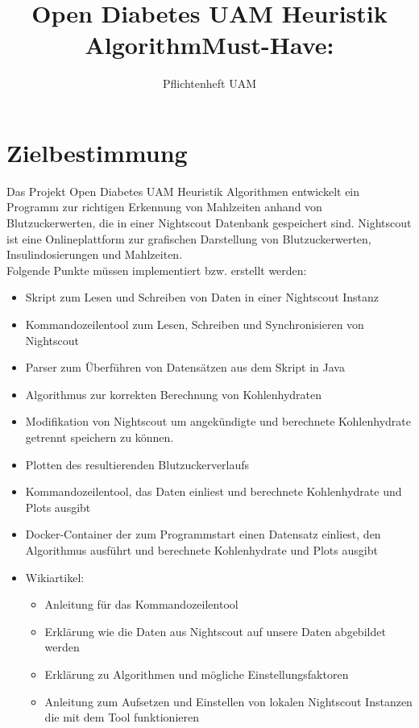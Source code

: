 \documentclass[accentcolor=tud0b,12pt,paper=a4]{tudreport}
\title{Open Diabetes UAM Heuristik Algorithm}
\subtitle{Pflichtenheft UAM}
\begin{document}
	\maketitle
	\tableofcontents 
	\newpage
	\chapter{Zielbestimmung}
	
	Das Projekt Open Diabetes UAM Heuristik Algorithmen entwickelt ein Programm zur richtigen Erkennung von Mahlzeiten anhand von Blutzuckerwerten, die in einer Nightscout Datenbank gespeichert sind. 
	Nightscout ist eine Onlineplattform zur grafischen Darstellung von Blutzuckerwerten, Insulindosierungen und Mahlzeiten. \\

Folgende Punkte müssen implementiert bzw. erstellt werden:\\

\title{\textbf{Must-Have:}}
\begin{itemize}
	\item Skript zum Lesen und Schreiben von Daten in einer Nightscout Instanz	
	\item Kommandozeilentool zum Lesen, Schreiben und Synchronisieren von Nightscout
	\item Parser zum Überführen von Datensätzen aus dem Skript in Java
	\item Algorithmus zur korrekten Berechnung von Kohlenhydraten
	\item Modifikation von Nightscout um angekündigte und berechnete Kohlenhydrate getrennt speichern  zu können.      %
	\item Plotten des resultierenden Blutzuckerverlaufs 
	\item Kommandozeilentool, das Daten einliest und berechnete Kohlenhydrate und Plots ausgibt
	\item Docker-Container der zum Programmstart einen Datensatz einliest, den Algorithmus ausführt und berechnete Kohlenhydrate und Plots ausgibt

	\item Wikiartikel:
	\begin{itemize}
	\item Anleitung für das Kommandozeilentool
	\item Erklärung wie die Daten aus Nightscout auf unsere Daten abgebildet werden
	\item Erklärung zu Algorithmen und mögliche Einstellungsfaktoren
	\item Anleitung zum Aufsetzen und Einstellen von lokalen Nightscout Instanzen die mit dem Tool funktionieren
	\end{itemize}

\end{itemize}
\end{document}
